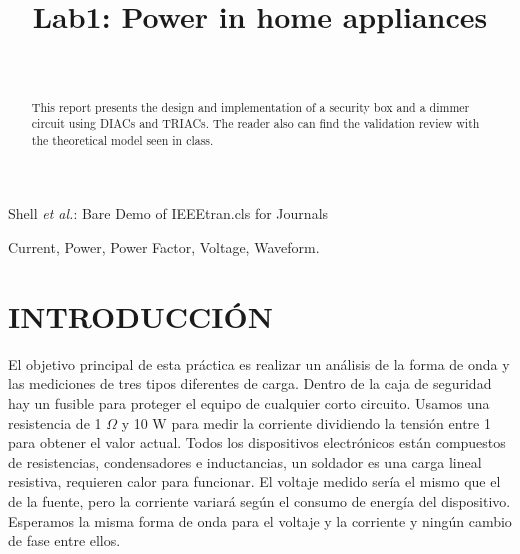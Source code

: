 \documentclass[journal]{IEEEtran}
\begin{document}
\title{\textbf{Lab1: Power in home appliances}}
\author{
  \\
}

%
{Shell \MakeLowercase{\textit{et al.}}: Bare Demo of IEEEtran.cls 
for Journals}
	
\maketitle

\begin{abstract}
This report presents the design and implementation 
of a security box and a dimmer circuit using DIACs 
and TRIACs. The reader also can find  the validation 
review with the theoretical model seen in class.    
\end{abstract}


\begin{IEEEkeywords}  
Current, Power, Power Factor, Voltage, Waveform.
\end{IEEEkeywords}

\IEEEpeerreviewmaketitle

\section{INTRODUCCIÓN}

El objetivo principal de esta práctica es realizar 
un análisis de la forma de onda y las mediciones 
de tres tipos diferentes de carga. Dentro de la caja 
de seguridad hay un fusible para proteger el equipo 
de cualquier corto circuito. Usamos una resistencia 
de 1 $\Omega$ y 10 W para medir la corriente dividiendo 
la tensión entre 1 para obtener el valor actual. 
Todos los dispositivos electrónicos están compuestos 
de resistencias, condensadores e inductancias, un 
soldador es una carga lineal resistiva, requieren calor 
para funcionar. El voltaje medido sería el mismo que 
el de la fuente, pero la corriente variará según el 
consumo de energía del dispositivo. Esperamos la misma 
forma de onda para el voltaje y la corriente y ningún 
cambio de fase entre ellos.\\
\end{document}
